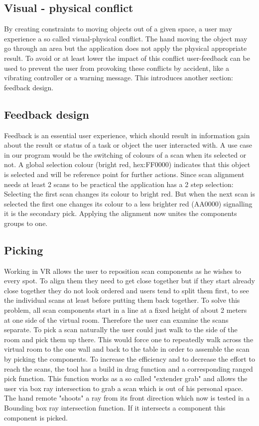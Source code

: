 \documentclass[hyperref,english,bachelorofscience,bibnum,twoside]{cgvpub}
\begin{document}
\subsection{Visual - physical conflict}

By creating constraints to moving objects out of a given space, a user may experience a so called visual-physical conflict. The hand moving the object may go through an area but the application does not apply the physical appropriate result\cite{Jerald2015}.
To avoid or at least lower the impact of this conflict user-feedback can be used to prevent the user from provoking these conflicts by accident, like a vibrating controller or a warning message. This introduces another section: feedback design.

\subsection{Feedback design}

Feedback is an essential user experience, which should result in information gain about the result or status of a task or object the user interacted with\cite{Jerald2015}.
A use case in our program would be the switching of colours of a scan when its selected or not. A global selection colour (bright red, hex:FF0000) indicates that this object is selected and will be reference point for further actions. Since scan alignment needs at least 2 scans to be practical the application has a 2 step selection:
Selecting the first scan changes its colour to bright red. But when the next scan is selected the first one changes its colour to a less brighter red (AA0000) signalling it is the secondary pick. Applying the alignment now unites the components groups to one.

\subsection{Picking}

Working in VR allows the user to reposition scan components as he wishes to every spot. To align them they need to get close together but if they start already close together they do not look ordered and users tend to split them first, to see the individual scans at least before putting them back together. To solve this problem, all scan components start in a line at a fixed height of about 2 meters at one side of the virtual room. Therefore the user can examine the scans separate.
To pick a scan naturally the user could just walk to the side of the room and pick them up there. This would force one to repeatedly walk across the virtual room to the one wall and back to the table in order to assemble the scan by picking the components. To increase the efficiency and to decrease the effort to reach the scans, the tool has a build in drag function and a corresponding ranged pick function. This function works as a so called "extender grab"\cite{Jerald2015} %
and allows the user via box ray intersection to grab a scan which is out of his personal space.
The hand remote "shoots" a ray from its front direction which now is tested in a Bounding box ray intersection function. If it intersects a component this component is picked.
\end{document}
